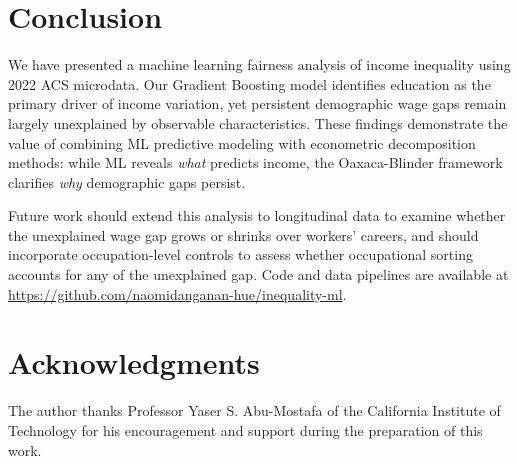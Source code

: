 \documentclass[11pt]{article}
\begin{document}
\section{Conclusion}

We have presented a machine learning fairness analysis of income inequality
using 2022 ACS microdata. Our Gradient Boosting model identifies education
as the primary driver of income variation, yet persistent demographic wage
gaps remain largely unexplained by observable characteristics. These findings
demonstrate the value of combining ML predictive modeling with econometric
decomposition methods: while ML reveals \textit{what} predicts income,
the Oaxaca-Blinder framework clarifies \textit{why} demographic gaps persist.

Future work should extend this analysis to longitudinal data to examine
whether the unexplained wage gap grows or shrinks over workers' careers,
and should incorporate occupation-level controls to assess whether occupational
sorting accounts for any of the unexplained gap. Code and data pipelines
are available at \url{https://github.com/naomidanganan-hue/inequality-ml}.

\section*{Acknowledgments}
The author thanks Professor Yaser S. Abu-Mostafa of the California 
Institute of Technology for his encouragement and support during 
the preparation of this work.
\end{document}
